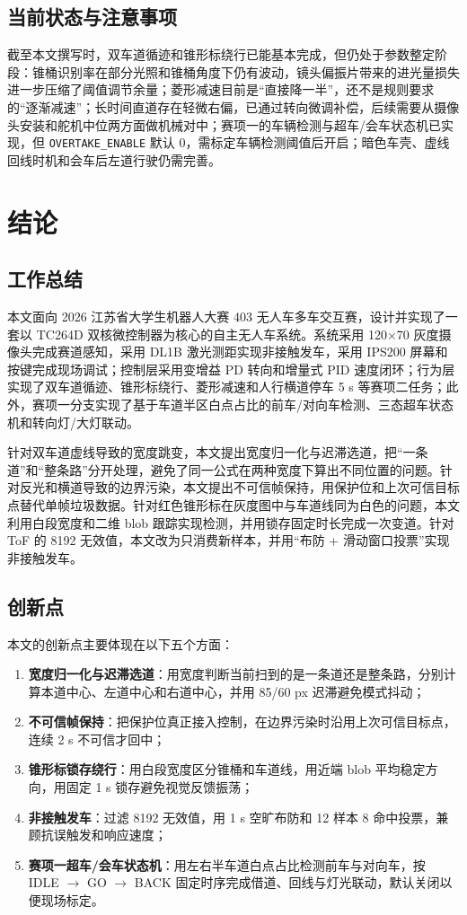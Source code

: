 \documentclass{MaiTechReport}
\begin{document}
\subsection{当前状态与注意事项}
截至本文撰写时，双车道循迹和锥形标绕行已能基本完成，但仍处于参数整定阶段：锥桶识别率在部分光照和锥桶角度下仍有波动，镜头偏振片带来的进光量损失进一步压缩了阈值调节余量；菱形减速目前是“直接降一半”，还不是规则要求的“逐渐减速”；长时间直道存在轻微右偏，已通过转向微调补偿，后续需要从摄像头安装和舵机中位两方面做机械对中；赛项一的车辆检测与超车/会车状态机已实现，但 \texttt{OVERTAKE\_ENABLE} 默认 0，需标定车辆检测阈值后开启；暗色车壳、虚线回线时机和会车后左道行驶仍需完善。


\section{结论}
\label{sec:conclusion}

\subsection{工作总结}
本文面向 2026 江苏省大学生机器人大赛 403 无人车多车交互赛，设计并实现了一套以 TC264D 双核微控制器为核心的自主无人车系统。系统采用 120$\times$70 灰度摄像头完成赛道感知，采用 DL1B 激光测距实现非接触发车，采用 IPS200 屏幕和按键完成现场调试；控制层采用变增益 PD 转向和增量式 PID 速度闭环；行为层实现了双车道循迹、锥形标绕行、菱形减速和人行横道停车 5 s 等赛项二任务；此外，赛项一分支实现了基于车道半区白点占比的前车/对向车检测、三态超车状态机和转向灯/大灯联动。

针对双车道虚线导致的宽度跳变，本文提出宽度归一化与迟滞选道，把“一条道”和“整条路”分开处理，避免了同一公式在两种宽度下算出不同位置的问题。针对反光和横道导致的边界污染，本文提出不可信帧保持，用保护位和上次可信目标点替代单帧垃圾数据。针对红色锥形标在灰度图中与车道线同为白色的问题，本文利用白段宽度和二维 blob 跟踪实现检测，并用锁存固定时长完成一次变道。针对 ToF 的 8192 无效值，本文改为只消费新样本，并用“布防 + 滑动窗口投票”实现非接触发车。

\subsection{创新点}
本文的创新点主要体现在以下五个方面：
\begin{enumerate}
  \item \textbf{宽度归一化与迟滞选道}：用宽度判断当前扫到的是一条道还是整条路，分别计算本道中心、左道中心和右道中心，并用 85/60 px 迟滞避免模式抖动；
  \item \textbf{不可信帧保持}：把保护位真正接入控制，在边界污染时沿用上次可信目标点，连续 2 s 不可信才回中；
  \item \textbf{锥形标锁存绕行}：用白段宽度区分锥桶和车道线，用近端 blob 平均稳定方向，用固定 1 s 锁存避免视觉反馈振荡；
  \item \textbf{非接触发车}：过滤 8192 无效值，用 1 s 空旷布防和 12 样本 8 命中投票，兼顾抗误触发和响应速度；
  \item \textbf{赛项一超车/会车状态机}：用左右半车道白点占比检测前车与对向车，按 IDLE $\to$ GO $\to$ BACK 固定时序完成借道、回线与灯光联动，默认关闭以便现场标定。
\end{enumerate}
\end{document}
